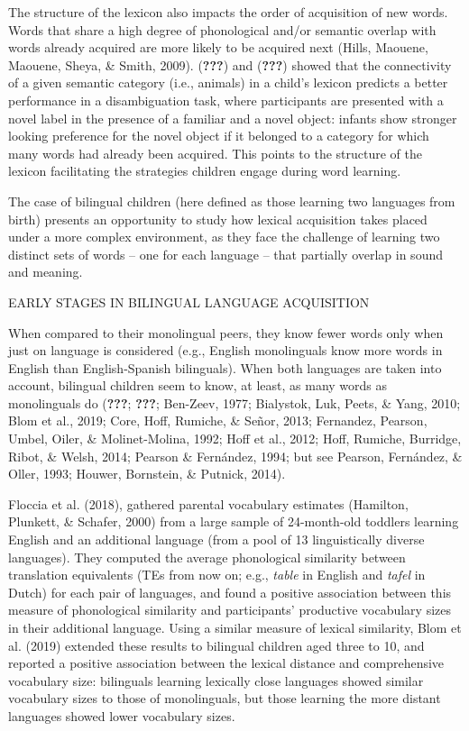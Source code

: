 \documentclass[
  english,
  man,man,floatsintext]{apa6}
\begin{document}
The structure of the lexicon also impacts the order of acquisition of new words. Words that share a high degree of phonological and/or semantic overlap with words already acquired are more likely to be acquired next (Hills, Maouene, Maouene, Sheya, \& Smith, 2009). ({\textbf{???}}) and ({\textbf{???}}) showed that the connectivity of a given semantic category (i.e., animals) in a child's lexicon predicts a better performance in a disambiguation task, where participants are presented with a novel label in the presence of a familiar and a novel object: infants show stronger looking preference for the novel object if it belonged to a category for which many words had already been acquired. This points to the structure of the lexicon facilitating the strategies children engage during word learning.

The case of bilingual children (here defined as those learning two languages from birth) presents an opportunity to study how lexical acquisition takes placed under a more complex environment, as they face the challenge of learning two distinct sets of words -- one for each language -- that partially overlap in sound and meaning.

EARLY STAGES IN BILINGUAL LANGUAGE ACQUISITION

When compared to their monolingual peers, they know fewer words only when just on language is considered (e.g., English monolinguals know more words in English than English-Spanish bilinguals). When both languages are taken into account, bilingual children seem to know, at least, as many words as monolinguals do ({\textbf{???}}; {\textbf{???}}; Ben-Zeev, 1977; Bialystok, Luk, Peets, \& Yang, 2010; Blom et al., 2019; Core, Hoff, Rumiche, \& Señor, 2013; Fernandez, Pearson, Umbel, Oiler, \& Molinet-Molina, 1992; Hoff et al., 2012; Hoff, Rumiche, Burridge, Ribot, \& Welsh, 2014; Pearson \& Fernández, 1994; but see Pearson, Fernández, \& Oller, 1993; Houwer, Bornstein, \& Putnick, 2014).

Floccia et al. (2018), gathered parental vocabulary estimates (Hamilton, Plunkett, \& Schafer, 2000) from a large sample of 24-month-old toddlers learning English and an additional language (from a pool of 13 linguistically diverse languages). They computed the average phonological similarity between translation equivalents (TEs from now on; e.g., \emph{table} in English and \emph{tafel} in Dutch) for each pair of languages, and found a positive association between this measure of phonological similarity and participants' productive vocabulary sizes in their additional language. Using a similar measure of lexical similarity, Blom et al. (2019) extended these results to bilingual children aged three to 10, and reported a positive association between the lexical distance and comprehensive vocabulary size: bilinguals learning lexically close languages showed similar vocabulary sizes to those of monolinguals, but those learning the more distant languages showed lower vocabulary sizes.
\end{document}
